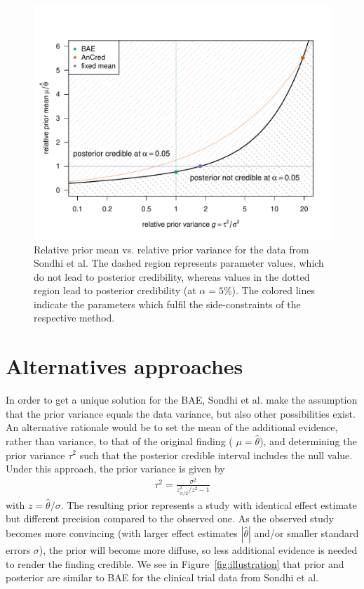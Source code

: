 \begin{figure}[!htb]
\begin{knitrout}
\color{fgcolor}
\includegraphics[width=\maxwidth]{images/paper5/plot-2d-1}
\end{knitrout}
\caption{Relative prior mean vs. relative prior variance for the data from
  Sondhi et al. The dashed region represents parameter values, which do not lead
  to posterior credibility, whereas values in the dotted region lead to
  posterior credibility (at $\alpha = 5\%$). The
  colored lines indicate the parameters which fulfil the side-constraints of the
  respective method.}
\label{fig:priospace}
\end{figure}

\section{Alternatives approaches}
In order to get a unique solution for the BAE, Sondhi et al. make the assumption
that the prior variance equals the data variance, but also other possibilities
exist. An alternative rationale would be to set the mean of the additional
evidence, rather than variance, to that of the original finding (\ie
$\mu = \hat{\theta}$), and determining the prior variance $\tau^{2}$ such that
the posterior credible interval includes the null value. Under this approach,
the prior variance is given by
\begin{align*}
  \tau^{2} = \frac{\sigma^{2}}{z_{\scriptscriptstyle \alpha/2}^2/z^2 - 1}
\end{align*}
with $z = \hat{\theta}/\sigma$. The resulting prior represents a study with
identical effect estimate but different precision compared to the observed one.
As the observed study becomes more convincing (with larger effect estimates
$|\hat{\theta}|$ and/or smaller standard errors $\sigma$), the prior will become
more diffuse, so less additional evidence is needed to render the finding
credible. We see in Figure~\ref{fig:illustration} that prior and posterior are
similar to BAE for the clinical trial data from Sondhi et al.


